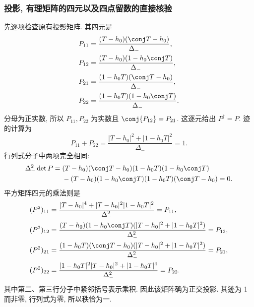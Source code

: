 \subsubsection*{投影, 有理矩阵的四元以及四点留数的直接核验}
先逐项检查原有投影矩阵.
其四元是
\[
\begin{aligned}
P_{11}&=\dfrac{(T-h_0)(\conj T-h_0)}{\Delta_-},\\
P_{12}&=\dfrac{(T-h_0)(1-h_0\conj T)}{\Delta_-},\\
P_{21}&=\dfrac{(1-h_0T)(\conj T-h_0)}{\Delta_-},\\
P_{22}&=\dfrac{(1-h_0T)(1-h_0\conj T)}{\Delta_-}.
\end{aligned}
\]
分母为正实数, 所以 $P_{11},P_{22}$ 为实数且
$\conj{P_{12}}=P_{21}$.
这逐元给出 $P^\dagger=P$.
迹的计算为
\[
P_{11}+P_{22}
=\dfrac{|T-h_0|^2+|1-h_0T|^2}{\Delta_-}=1.
\]
行列式分子中两项完全相同:
\[
\begin{aligned}
\Delta_-^2\det P
={}&(T-h_0)(\conj T-h_0)(1-h_0T)(1-h_0\conj T)\\
&-(T-h_0)(1-h_0\conj T)(1-h_0T)(\conj T-h_0)=0.
\end{aligned}
\]
平方矩阵四元的乘法则是
\[
\begin{aligned}
(P^2)_{11}
&=\dfrac{|T-h_0|^4+|T-h_0|^2|1-h_0T|^2}{\Delta_-^2}
=P_{11},\\
(P^2)_{12}
&=\dfrac{(T-h_0)(1-h_0\conj T)
(|T-h_0|^2+|1-h_0T|^2)}{\Delta_-^2}
=P_{12},\\
(P^2)_{21}
&=\dfrac{(1-h_0T)(\conj T-h_0)
(|T-h_0|^2+|1-h_0T|^2)}{\Delta_-^2}
=P_{21},\\
(P^2)_{22}
&=\dfrac{|1-h_0T|^2|T-h_0|^2+|1-h_0T|^4}{\Delta_-^2}
=P_{22}.
\end{aligned}
\]
其中第二、第三行分子中紧邻括号表示乘积.
因此该矩阵确为正交投影.
其迹为 1 而非零, 行列式为零, 所以秩恰为一.

